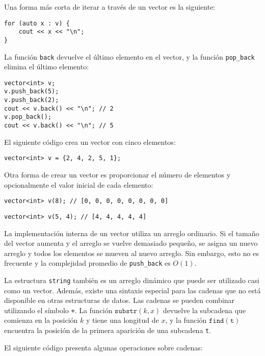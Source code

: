 Una forma más corta de iterar a través de un vector es la siguiente:

\begin{lstlisting}
for (auto x : v) {
    cout << x << "\n";
}
\end{lstlisting}

La función \texttt{back} devuelve el último elemento
en el vector, y
la función \texttt{pop\_back} elimina el último elemento:

\begin{lstlisting}
vector<int> v;
v.push_back(5);
v.push_back(2);
cout << v.back() << "\n"; // 2
v.pop_back();
cout << v.back() << "\n"; // 5
\end{lstlisting}

El siguiente código crea un vector con cinco elementos:

\begin{lstlisting}
vector<int> v = {2, 4, 2, 5, 1};
\end{lstlisting}

Otra forma de crear un vector es proporcionar el número
de elementos y opcionalmente el valor inicial de cada elemento:

\begin{lstlisting}
vector<int> v(8); // [0, 0, 0, 0, 0, 0, 0, 0]
\end{lstlisting}
\begin{lstlisting}
vector<int> v(5, 4); // [4, 4, 4, 4, 4]
\end{lstlisting}

La implementación interna de un vector
utiliza un arreglo ordinario.
Si el tamaño del vector aumenta y
el arreglo se vuelve demasiado pequeño,
se asigna un nuevo arreglo y todos los
elementos se mueven al nuevo arreglo.
Sin embargo, esto no es frecuente y la
complejidad promedio de
\texttt{push\_back} es $O(1)$.


La estructura \texttt{string} también es un arreglo dinámico que
puede ser utilizado casi como un vector.
Además, existe una sintaxis especial para las cadenas
que no está disponible en otras estructuras de datos.
Las cadenas se pueden combinar utilizando el símbolo \texttt{+}.
La función $\texttt{substr}(k,x)$ devuelve la subcadena
que comienza en la posición $k$ y tiene una longitud de $x$,
y la función $\texttt{find}(\texttt{t})$ encuentra la posición
de la primera aparición de una subcadena \texttt{t}.

El siguiente código presenta algunas operaciones sobre cadenas:

